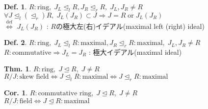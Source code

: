 \documentclass[uplatex,dvipdfmx,9pt]{beamer}
\newcommand{\defarrow}{\overset{\mathrm{def}}{\Leftrightarrow}}
\newcommand{\lideal}{\trianglelefteq_l}
\newcommand{\rideal}{\trianglelefteq_r}
\newcommand{\ideal}{\trianglelefteq}
\newcounter{textThmCount}
\theoremstyle{definition} %
\newtheorem{defn}{Def.}[subsection] %
\newtheorem{thmText}[textThmCount]{Thm.}
\newtheorem{corText}{Cor.}[textThmCount] %
\theoremstyle{example}
\begin{document}
    \begin{frame}

      \begin{defn}
        $R : \text{ring}, \; J_L \lideal R, J_R \rideal R, \; J_L, J_R \neq R$ \\
        $\forall J \lideal (\rideal) R, \; J_L(J_R) \subset J \Rightarrow J = R \; \text{or} \; J_L(J_R)$ \\
        $\defarrow$ $J_L(J_R)$ : $R$の\alert{極大左(右)イデアル(maximal left (right) ideal)}
      \end{defn}

      \begin{defn}
        $R : \text{ring}, \; J_L \lideal R : \text{maximal}, J_R \rideal R : \text{maximal}, \; J_L, J_R \neq R$ \\
        $R : \text{commutative} \Rightarrow J_L = J_R$ : \alert{極大イデアル(maximal ideal)}
      \end{defn}

      \begin{thmText}
        $R : \text{ring}, \; J \ideal R, \; J \neq R$ \\
        $R/J : \text{skew field} \Leftrightarrow J \lideal R : \text{maximal} \Leftrightarrow J \rideal R : \text{maximal}$
      \end{thmText}

      \begin{corText}
        $R : \text{commutative ring}, \; J \ideal R, \; J \neq R$ \\
        $R/J : \text{field} \Leftrightarrow J \ideal R : \text{maximal}$
      \end{corText}
      
    \end{frame}
\end{document}

